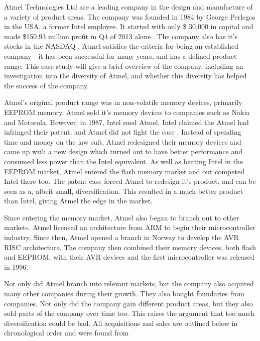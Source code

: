 

Atmel Technologies Ltd are a leading company in the design and manufacture of a variety of product areas. 
The company was founded in 1984 by George Perlegos in the USA, a former Intel employee. 
It started with only \$ 30,000 in capital \cite{atmel:capital} and made \$150.93 million profit in Q4 of 2013 alone \cite{atmel:profit}.
The company also has it's stocks in the NASDAQ \cite{atmel:nasdaq}.
Atmel satisfies the criteria for being an established company - it has been successful for many years, and has a defined product range.
This case study will give a brief overview of the company, including an investigation into the diversity of Atmel, and whether this diversity has helped the success of the company.



Atmel's original product range was in non-volatile memory devices, primarily EEPROM memory.
Atmel sold it's memory devices to companies such as Nokia and Motorola.
However, in 1987, Intel sued Atmel.
Intel claimed the Atmel had infringed their patent, and Atmel did not fight the case \cite{atmel:intel}.
Instead of spending time and money on the law suit, Atmel redesigned their memory devices and came up with a new design which turned out to have better performance and consumed less power than the Intel equivalent.
As well as beating Intel in the EEPROM market, Atmel entered the flash memory market and out competed Intel there too.
The patent case forced Atmel to redesign it's product, and can be seen as a, albeit small, diversification.
This resulted in a much better product than Intel, giving Atmel the edge in the market.


Since entering the memory market, Atmel also began to branch out to other markets. 
Atmel licensed an architecture from ARM to begin their microcontroller industry.
Since then, Atmel opened a branch in Norway to develop the AVR RISC architecture.
The company then combined their memory devices, both flash and EEPROM, with their AVR devices and the first microcontroller was released in 1996.

Not only did Atmel branch into relevant markets, but the company also acquired many other companies during their growth. They also bought foundaries from companies. 
Not only did the company gain different product areas, but they also sold parts of the company over time too. 
This raises the argument that too much diversification could be bad.
All acquisitions and sales are outlined below in chronological order and were found from \cite{atmel:acq1, atmel:acq2}

